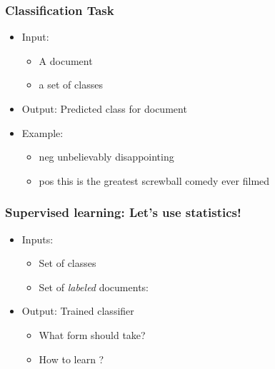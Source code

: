\author{Angel Xuan Chang \\ 
  {} \\
  {\color{gray}{adapted from lecture slides from \\ Anoop Sarkar, Danqi Chen and Karthik Narasimhan}}
}


\begin{frame}
\frametitle{Classification Task}
\begin{itemize}[<+->]
\item Input: 
  \begin{itemize}
  \item A document  
  \item a set of classes 
  \end{itemize}
\item Output: Predicted class  for document 
\item Example:
  \begin{itemize}
  \item {\color{red} neg} unbelievably disappointing 
  \item {\color{green} pos} this is the greatest screwball comedy ever filmed  
  \end{itemize}
\end{itemize}
\end{frame}

\begin{frame}
\frametitle{Supervised learning: Let's use statistics!}
\begin{itemize}[<+->]
\item Inputs: 
  \begin{itemize}
  \item Set of  classes 
  \item Set of  {\em labeled} documents: 
  \end{itemize}
\item Output: Trained classifier 
  \begin{itemize}
  \item What form should  take?
  \item How to learn ?
  \end{itemize}
\end{itemize}
\end{frame}

